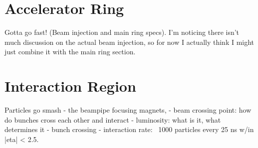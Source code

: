     


\section{Accelerator Ring}
    Gotta go fast! (Beam injection and main ring specs).
    I'm noticing there isn't much discussion on the actual beam injection, so for now I actually think I might just combine it with the main ring section.

\section{Interaction Region}
    Particles go smash
    - the beampipe focusing magnets,
    - beam crossing point: how do bunches cross each other and interact
    - luminosity: what is it, what determines it 
    - bunch crossing
    - interaction rate: ~1000 particles every 25 ns w/in |eta| < 2.5.
